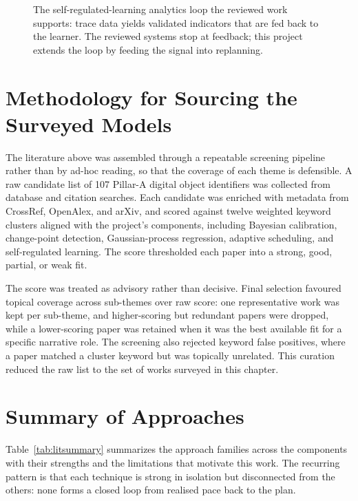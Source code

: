 \begin{figure}[htbp]
\centering
{}
\caption{The self-regulated-learning analytics loop the reviewed work supports: trace data yields validated indicators that are fed back to the learner. The reviewed systems stop at feedback; this project extends the loop by feeding the signal into replanning.}
\label{fig:srl-loop}
\end{figure}

\section{Methodology for Sourcing the Surveyed Models}
The literature above was assembled through a repeatable screening pipeline rather than by ad-hoc reading, so that the coverage of each theme is defensible. A raw candidate list of 107 Pillar-A digital object identifiers was collected from database and citation searches. Each candidate was enriched with metadata from CrossRef, OpenAlex, and arXiv, and scored against twelve weighted keyword clusters aligned with the project's components, including Bayesian calibration, change-point detection, Gaussian-process regression, adaptive scheduling, and self-regulated learning. The score thresholded each paper into a strong, good, partial, or weak fit.

The score was treated as advisory rather than decisive. Final selection favoured topical coverage across sub-themes over raw score: one representative work was kept per sub-theme, and higher-scoring but redundant papers were dropped, while a lower-scoring paper was retained when it was the best available fit for a specific narrative role. The screening also rejected keyword false positives, where a paper matched a cluster keyword but was topically unrelated. This curation reduced the raw list to the set of works surveyed in this chapter.

\section{Summary of Approaches}
Table~\ref{tab:litsummary} summarizes the approach families across the components with their strengths and the limitations that motivate this work. The recurring pattern is that each technique is strong in isolation but disconnected from the others: none forms a closed loop from realised pace back to the plan.

